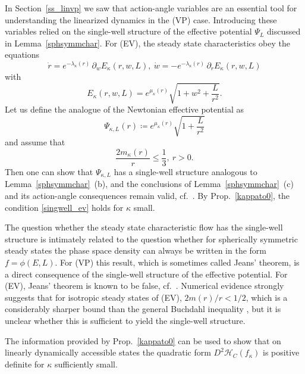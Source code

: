 \documentclass[11pt]{article}
\begin{document}
In Section~\ref{ss_linvp} we saw that action-angle variables
are an essential tool for understanding the linearized dynamics
in the (VP) case. Introducing these variables relied on the single-well
structure of the effective potential $\Psi_L$ discussed in
Lemma~\ref{sphsymmchar}.
For (EV), the steady state characteristics obey the equations
\[
\dot r =  e^{-\lambda_\kappa (r)}\,\partial_w E_\kappa (r,w,L),\ 
\dot w = -e^{-\lambda_\kappa (r)}\,\partial_r E_\kappa (r,w,L)
\]
with
\[
E_\kappa (r,w,L) = e^{\mu_\kappa(r)}\sqrt{1+w^2 + \frac{L}{r^2}}.
\]
Let us define the analogue of the Newtonian effective potential as
\[
\Psi_{\kappa,L}(r) \coloneqq e^{\mu_\kappa(r)}\sqrt{1 + \frac{L}{r^2}}
\]
and assume that
\begin{equation} \label{singwell_ev}
  \frac{2 m_\kappa (r)}{r} \leq \frac{1}{3},\ r>0.
\end{equation}
Then one can show that $\Psi_{\kappa,L}$ has a single-well structure
analogous to Lemma~\ref{sphsymmchar}~(b), and the conclusions of
Lemma~\ref{sphsymmchar}~(c) and its action-angle consequences
remain valid, cf.~\cite[Section~3]{GueStrRe}. By Prop.~\ref{kappato0},
the condition \eqref{singwell_ev} holds for $\kappa$ small.
%
\begin{remark}
  The question whether the steady state characteristic flow has the
  single-well structure is intimately related to the question whether
  for spherically symmetric steady states the phase space density
  can always be written in the form $f=\phi(E,L)$. For (VP) this
  result, which is sometimes called Jeans' theorem, is a direct
  consequence of the single-well structure of the effective potential.
  For (EV), Jeans' theorem is known to be false, cf.~\cite{Sch2}.
  Numerical evidence strongly suggests that for isotropic steady
  states of (EV), $2 m (r)/r < 1/2$, which is a considerably
  sharper bound than the general Buchdahl inequality
  \cite{Andr2007,Andr2008,Buch},
  but it is unclear
  whether this is sufficient to yield the single-well structure.
\end{remark}
%
The information provided by Prop.~\ref{kappato0} can be used to show
that on linearly dynamically accessible states the quadratic
form $D^2\mathcal{H}_C(f_\kappa)$ is positive definite for $\kappa$ sufficiently
small.
%
\end{document}
